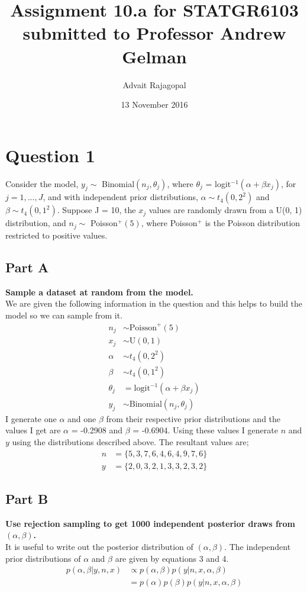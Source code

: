 \documentclass{article}
\title{Assignment 10.a for \textbf{STATGR6103}\\
\large submitted to Professor Andrew Gelman}
\date{13 November 2016}
\author{Advait Rajagopal}
\begin{document}
  \maketitle
\section{Question 1}
Consider the model, $y_j \sim$ Binomial$(n_j,\theta_j)$, where $\theta_j$ = logit$^{-1}(\alpha + \beta x_j)$, for $j = 1,...,J$, and with independent prior distributions, $\alpha \sim t_4(0,2^2)$ and $\beta \sim t_4(0,1^2)$. Suppose J = 10, the $x_j$ values are randomly drawn from a U(0, 1) distribution, and $n_j \sim$ Poisson$^+(5)$, where Poisson$^+$ is the Poisson distribution restricted to positive values.
\subsection{Part A}
\textbf{Sample a dataset at random from the model.}\\
We are given the following information in the question and this helps to build the model so we can sample from it.
\begin{align}
n_j &\sim \text{Poisson}^+(5)\\
x_j &\sim \text{U}(0,1)\\
\alpha &\sim t_4(0,2^2)\\
\beta &\sim t_4(0,1^2)\\
\theta_j &= \text{logit}^{-1}(\alpha + \beta x_j)\\
y_j &\sim  \text{Binomial}(n_j,\theta_j)
\end{align}
I generate one $\alpha$ and one $\beta$ from their respective prior distributions and the values I get are $\alpha$ = -0.2908 and $\beta$ = -0.6904. Using these values I generate $n$ and $y$ using the distributions described above. The resultant values are;
\begin{align*}
n &= \{5,3,7,6,4,6,4,9,7,6 \}\\
y &= \{2,0,3,2,1,3,3,2,3,2\}
\end{align*}

\subsection{Part B}
\textbf{Use rejection sampling to get 1000 independent posterior draws from $(\alpha,\beta)$.}\\
It is useful to write out the posterior distribution of $(\alpha,\beta)$. The independent prior distributions of $\alpha$ and $\beta$ are given by equations 3 and 4.
\begin{align*}
p(\alpha,\beta | y, n, x) &\propto p(\alpha,\beta) p(y | n,  x,  \alpha, \beta) \\
&= p(\alpha)p(\beta) p(y | n,  x,  \alpha, \beta) \\
\end{align*}
\end{document}
